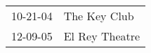 \begin{supertabular}{p{0.25\columnwidth}p{0.75\columnwidth}}
 10-21-04 &    The Key Club \\
 12-09-05 &  El Rey Theatre \\
\end{supertabular}
